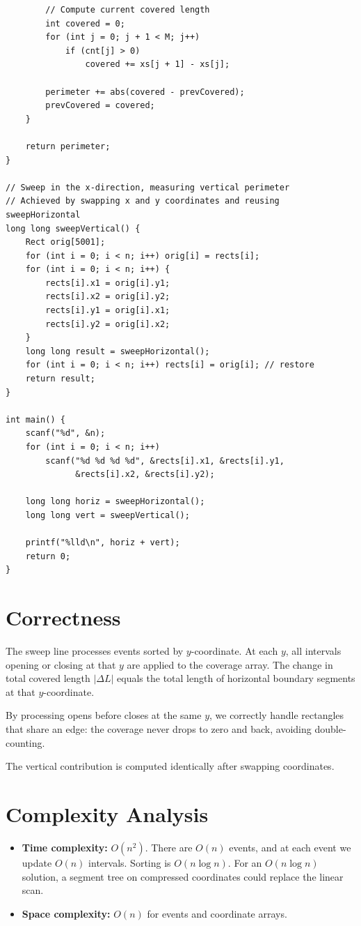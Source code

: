 \documentclass[11pt,a4paper]{article}
\begin{document}
\begin{lstlisting}
        // Compute current covered length
        int covered = 0;
        for (int j = 0; j + 1 < M; j++)
            if (cnt[j] > 0)
                covered += xs[j + 1] - xs[j];

        perimeter += abs(covered - prevCovered);
        prevCovered = covered;
    }

    return perimeter;
}

// Sweep in the x-direction, measuring vertical perimeter
// Achieved by swapping x and y coordinates and reusing sweepHorizontal
long long sweepVertical() {
    Rect orig[5001];
    for (int i = 0; i < n; i++) orig[i] = rects[i];
    for (int i = 0; i < n; i++) {
        rects[i].x1 = orig[i].y1;
        rects[i].x2 = orig[i].y2;
        rects[i].y1 = orig[i].x1;
        rects[i].y2 = orig[i].x2;
    }
    long long result = sweepHorizontal();
    for (int i = 0; i < n; i++) rects[i] = orig[i]; // restore
    return result;
}

int main() {
    scanf("%d", &n);
    for (int i = 0; i < n; i++)
        scanf("%d %d %d %d", &rects[i].x1, &rects[i].y1,
              &rects[i].x2, &rects[i].y2);

    long long horiz = sweepHorizontal();
    long long vert = sweepVertical();

    printf("%lld\n", horiz + vert);
    return 0;
}
\end{lstlisting}

\section{Correctness}

The sweep line processes events sorted by $y$-coordinate. At each $y$, all intervals
opening or closing at that $y$ are applied to the coverage array. The change in total
covered length $|\Delta L|$ equals the total length of horizontal boundary segments
at that $y$-coordinate.

By processing opens before closes at the same $y$, we correctly handle rectangles
that share an edge: the coverage never drops to zero and back, avoiding double-counting.

The vertical contribution is computed identically after swapping coordinates.

\section{Complexity Analysis}

\begin{itemize}
  \item \textbf{Time complexity:} $O(n^2)$. There are $O(n)$ events, and at each event
        we update $O(n)$ intervals. Sorting is $O(n \log n)$.
        For an $O(n \log n)$ solution, a segment tree on compressed coordinates could
        replace the linear scan.
  \item \textbf{Space complexity:} $O(n)$ for events and coordinate arrays.
\end{itemize}
\end{document}
